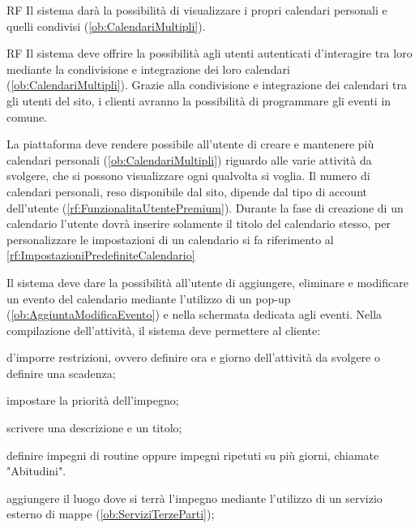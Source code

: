 \begin{listaPersonale}{RF}
	 Il sistema darà la possibilità di visualizzare i propri calendari personali e quelli condivisi (\ref{ob:CalendariMultipli}).
	\begin{listaPersonale2}{RF}
		 Il sistema deve offrire la possibilità agli utenti autenticati d'interagire tra loro mediante la condivisione e integrazione dei loro calendari (\ref{ob:CalendariMultipli}). Grazie alla condivisione e integrazione dei calendari tra gli utenti del sito, i clienti avranno la possibilità di programmare gli eventi in comune.

		 La piattaforma deve rendere possibile all'utente di creare e mantenere più calendari personali (\ref{ob:CalendariMultipli}) riguardo alle varie attività da svolgere, che si possono visualizzare ogni qualvolta si voglia. Il numero di calendari personali, reso disponibile dal sito, dipende dal tipo di account dell'utente (\ref{rf:FunzionalitaUtentePremium}). Durante la fase di creazione di un calendario l'utente dovrà inserire solamente il titolo del calendario stesso, per personalizzare le impostazioni di un calendario si fa riferimento al \ref{rf:ImpostazioniPredefiniteCalendario}
	\end{listaPersonale2}

	 Il sistema deve dare la possibilità all'utente di aggiungere, eliminare e modificare un evento del calendario mediante l'utilizzo di un pop-up (\ref{ob:AggiuntaModificaEvento}) e nella schermata dedicata agli eventi. Nella compilazione dell'attività, il sistema deve permettere al cliente:
	\begin{listaPersonale2}[RF]{}
		 d'imporre restrizioni, ovvero definire ora e giorno dell'attività da svolgere o definire una scadenza;

		 impostare la priorità dell'impegno;

		 scrivere una descrizione e un titolo;

		 definire impegni di routine oppure impegni ripetuti su più giorni, chiamate "Abitudini".

		 aggiungere il luogo dove si terrà l'impegno mediante l'utilizzo di un servizio esterno di mappe (\ref{ob:ServiziTerzeParti});


\end{listaPersonale2}
\end{listaPersonale}
